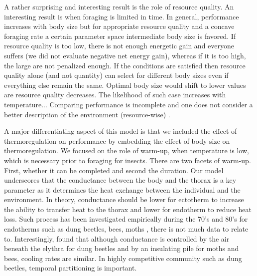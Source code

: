 A rather surprising and interesting result is the role of resource quality.
An interesting result is when foraging is limited in time.
In general, performance increases with body size but for appropriate resource quality and a concave foraging rate a certain parameter space intermediate body size is favored.
If resource quality is too low, there is not enough energetic gain and everyone suffers (we did not evaluate negative net energy gain), whereas if it is too high, the large are not penalized enough.
If the conditions are satisfied then resource quality alone (and not quantity) can select for different body sizes even if everything else remain the same.
Optimal body size would shift to lower values are resource quality decreases.
The likelihood of such case increases with temperature...
Comparing performance is incomplete and one does not consider a better description of the environment (resource-wise) \citet{Sears2015}.


A major differentiating aspect of this model is that we included the effect of thermoregulation on performance by embedding the effect of body size on thermoregulation.
We focused on the role of warm-up, when temperature is low, which is  necessary prior to foraging for insects.
There are two facets of warm-up.
First, whether it can be completed and second the duration.
Our model underscores that the conductance between the body and the thorax is a key parameter as it determines the heat exchange between the individual and the environment.
In theory, conductance should be lower for ectotherm to increase the ability to transfer heat to the thorax and lower for endotherm to  reduce heat loss.  
Such process has been investigated empirically during the 70's and 80's for endotherms  such as dung beetles, bees, moths \citep{Heinrich1975, Bartholomew1978, Bartholomew1981}, there is not much data to relate to.
Interestingly, \citet{Bartholomew1978} found that although conductance is controlled by the air beneath the elythra for dung beetles and by an insulating pile for moths and bees, cooling rates are similar.  
In highly competitive community such as dung beetles, temporal partitioning is important.
%
%
%
%
%

